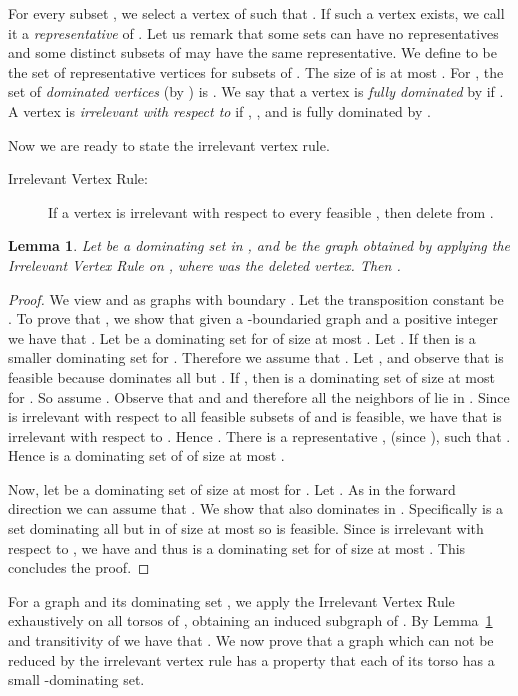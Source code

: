\documentclass[11pt]{article}
\newtheorem{lemma}{Lemma}
\begin{document}
For every subset , we select a vertex  of  such that . If such a vertex exists,  we call it a \emph{representative} of . 
Let us remark that some sets can have no representatives and some distinct subsets of  may have the same representative. 
We define  to be the set of representative vertices for subsets of . The size of  is at most . For ,  the set of {\em dominated vertices} (by ) is . We say that a  vertex  is {\em fully dominated} by  if . A vertex  is {\em irrelevant with respect to } if , ,  and  is fully dominated by . 

Now we are ready to state the irrelevant vertex rule. 
\begin{description}
\item[Irrelevant Vertex Rule:] If a vertex  is irrelevant with respect to every feasible , then delete  from . 
\end{description}



 \begin{lemma}
 \label{lem:domseteqiv1}
Let  be a dominating set in , and  be the graph obtained by applying the Irrelevant Vertex Rule on , where  was the deleted vertex. Then .
\end{lemma}
 \begin{proof}
 We view  and  as graphs with boundary . 
 Let the transposition constant be . To prove that , we show that given a -boundaried graph  and a positive 
 integer  we have that . 
  Let   be a dominating set for  of size at most .  Let . If  then 
   is a smaller dominating set for . Therefore we assume that .  Let , and observe that  is feasible because   dominates all but .  If , then  is a dominating set of size at most  for 
  . So assume . Observe that  and  and therefore all the neighbors of  lie in . Since  is irrelevant with respect to all feasible subsets of  and  is feasible, we have that  is irrelevant with respect to . Hence 
  . There is a representative ,  (since ), such that . Hence   is a dominating set of 
   of size at most . 
  
Now, let   be a dominating set of size at most  for .  Let  . As in the forward direction we can assume that . We show that  also dominates  in . Specifically  is a set dominating all but  in  of size at most  so  is feasible. Since  is irrelevant with respect to , we have  and thus  is a dominating set for  of size at most . This concludes the proof. 
 \end{proof}

For a graph  and its dominating set , we apply the Irrelevant Vertex Rule exhaustively on all torsos of , obtaining an induced subgraph  of . By Lemma~\ref{lem:domseteqiv1} and transitivity of  we have that . We now prove that a graph  which can not be reduced by the irrelevant vertex rule has a property that each of its torso has a small -dominating set. 
\end{document}
